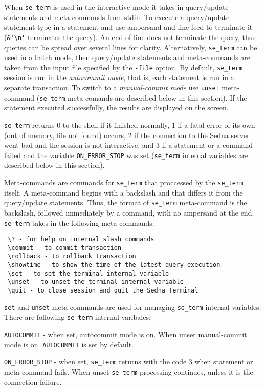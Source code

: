 \documentclass[a4paper,12pt]{article}
\begin{document}
When \verb!se_term! is used in the interactive mode it takes in query/update statements and meta-commands from stdin. To execute a query/update statement type in a statement and use ampersand and line feed to terminate it (\verb!&'\n'! terminates the query). An end of line does not terminate the query, thus queries can be spread over several lines for clarity. Alternatively, \verb!se_term! can be used in a batch mode, then query/update statements and meta-commands are taken from the input file specified by the \verb!-file! option. By default, \verb!se_term! session is run in the \emph{autocommit mode}, that is, each statement is run in a separate transaction. To switch to a \emph{manual-commit mode} use \verb!unset! meta-command (\verb!se_term! meta-comands are described below in this section). If the statement executed successfully, the results are displayed on the screen.

\verb!se_term! returns 0 to the shell if it finished normally, 1 if a fatal error of its own (out of memory, file not
found) occurs, 2 if the connection to the Sedna server went bad and the session is not interactive, and 3 if
a statement or a command failed and the variable \verb!ON_ERROR_STOP! was set (\verb!se_term! internal variables are described below in this section).

Meta-commands are commands for \verb!se_term! that proccessed by the \verb!se_term! itself. A meta-command begins with a backslash and that differs it from the query/update statements. Thus, the format of \verb!se_term! meta-command is the backslash, followed immediately by a command, with no ampersand at the end. \verb!se_term! takes in the following meta-commands:

\begin{verbatim}
 \? - for help on internal slash commands
 \commit - to commit transaction
 \rollback - to rollback transaction
 \showtime - to show the time of the latest query execution
 \set - to set the terminal internal variable
 \unset - to unset the terminal internal variable
 \quit - to close session and quit the Sedna Terminal
\end{verbatim}

\verb!set! and \verb!unset! meta-commands are used for managing \verb!se_term! internal variables. There are following \verb!se_term! internal varibales:

\verb!AUTOCOMMIT! - when set, autocommit mode is on. When unset manual-commit mode is on. \verb!AUTOCOMMIT! is set by default.

\verb!ON_ERROR_STOP! - when set, \verb!se_term! returns with the code 3 when statement or meta-command fails. When unset \verb!se_term! processing continues, unless it is the connection failure.
\end{document}
